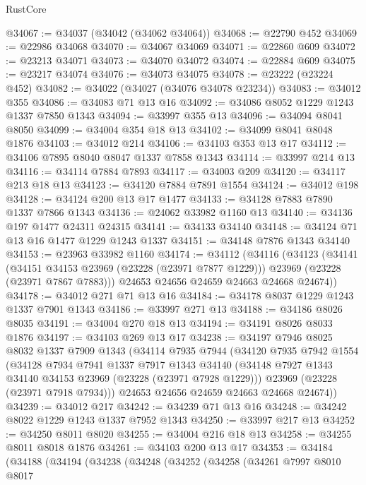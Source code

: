 \begin{lexlean}{RustCore}
\begin{coremodule}
@34067 := @34037 (@34042 (@34062 @34064))
@34068 := @22790 @452
@34069 := @22986 @34068
@34070 := @34067 @34069
@34071 := @22860 @609
@34072 := @23213 @34071
@34073 := @34070 @34072
@34074 := @22884 @609
@34075 := @23217 @34074
@34076 := @34073 @34075
@34078 := @23222 (@23224 @452)
@34082 := @34022 (@34027 (@34076 @34078 @23234))
@34083 := @34012 @355
@34086 := @34083 @71 @13 @16
@34092 := @34086 @8052 @1229 @1243 @1337 @7850 @1343
@34094 := @33997 @355 @13
@34096 := @34094 @8041 @8050
@34099 := @34004 @354 @18 @13
@34102 := @34099 @8041 @8048 @1876
@34103 := @34012 @214
@34106 := @34103 @353 @13 @17
@34112 := @34106 @7895 @8040 @8047 @1337 @7858 @1343
@34114 := @33997 @214 @13
@34116 := @34114 @7884 @7893
@34117 := @34003 @209
@34120 := @34117 @213 @18 @13
@34123 := @34120 @7884 @7891 @1554
@34124 := @34012 @198
@34128 := @34124 @200 @13 @17 @1477
@34133 := @34128 @7883 @7890 @1337 @7866 @1343
@34136 := @24062 @33982 @1160 @13
@34140 := @34136 @197 @1477 @24311 @24315
@34141 := @34133 @34140
@34148 := @34124 @71 @13 @16 @1477 @1229 @1243 @1337
@34151 := @34148 @7876 @1343 @34140
@34153 := @23963 @33982 @1160
@34174 := @34112
    (@34116
      (@34123
        (@34141
          (@34151 @34153 @23969 (@23228 (@23971 @7877 @1229)))
          @23969
          (@23228 (@23971 @7867 @7883)))
        @24653
        @24656
        @24659
        @24663
        @24668
        @24674))
@34178 := @34012 @271 @71 @13 @16
@34184 := @34178 @8037 @1229 @1243 @1337 @7901 @1343
@34186 := @33997 @271 @13
@34188 := @34186 @8026 @8035
@34191 := @34004 @270 @18 @13
@34194 := @34191 @8026 @8033 @1876
@34197 := @34103 @269 @13 @17
@34238 := @34197
    @7946
    @8025
    @8032
    @1337
    @7909
    @1343
    (@34114
      @7935
      @7944
      (@34120
        @7935
        @7942
        @1554
        (@34128
          @7934
          @7941
          @1337
          @7917
          @1343
          @34140
          (@34148 @7927 @1343 @34140 @34153 @23969 (@23228 (@23971 @7928 @1229)))
          @23969
          (@23228 (@23971 @7918 @7934)))
        @24653
        @24656
        @24659
        @24663
        @24668
        @24674))
@34239 := @34012 @217
@34242 := @34239 @71 @13 @16
@34248 := @34242 @8022 @1229 @1243 @1337 @7952 @1343
@34250 := @33997 @217 @13
@34252 := @34250 @8011 @8020
@34255 := @34004 @216 @18 @13
@34258 := @34255 @8011 @8018 @1876
@34261 := @34103 @200 @13 @17
@34353 := @34184
    (@34188
      (@34194
        (@34238
          (@34248
            (@34252
              (@34258
                (@34261
                  @7997
                  @8010
                  @8017

\end{coremodule}
\end{lexlean}
